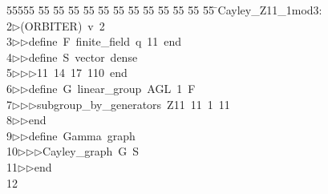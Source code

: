 %
%
\begin{tabbing}
55555 \= 55 \= 55 \= 55 \= 55 \= 55 \= 55 \= 55 \= 55 \= 55 \= 55 \= 55 \= 55 \= \>Cayley\_Z11\_1mod3:\\[0pt]
2\>$\triangleright$\>(ORBITER)\ v\ 2\ \\[0pt]
3\>$\triangleright$\>$\triangleright$\>define\ F\ finite\_field\ q\ 11\ end\ \\[0pt]
4\>$\triangleright$\>$\triangleright$\>define\ S\ vector\ dense\ \\[0pt]
5\>$\triangleright$\>$\triangleright$\>$\triangleright$\>11\ 14\ 17\ 110\ end\ \\[0pt]
6\>$\triangleright$\>$\triangleright$\>define\ G\ linear\_group\ AGL\ 1\ F\ \\[0pt]
7\>$\triangleright$\>$\triangleright$\>$\triangleright$\>subgroup\_by\_generators\ Z11\ 11\ 1\ 11\ \\[0pt]
8\>$\triangleright$\>$\triangleright$\>end\ \\[0pt]
9\>$\triangleright$\>$\triangleright$\>define\ Gamma\ graph\ \\[0pt]
10\>$\triangleright$\>$\triangleright$\>$\triangleright$\>Cayley\_graph\ G\ S\ \\[0pt]
11\>$\triangleright$\>$\triangleright$\>end\ \\[0pt]
12\>\end{tabbing}
